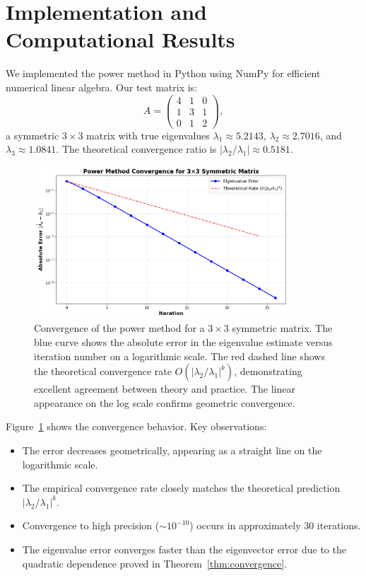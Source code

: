 \documentclass[11pt,a4paper]{article}
\begin{document}
\section{Implementation and Computational Results}

We implemented the power method in Python using NumPy for efficient numerical linear algebra. Our test matrix is:
\begin{equation}
A = \begin{pmatrix}
4 & 1 & 0 \\
1 & 3 & 1 \\
0 & 1 & 2
\end{pmatrix},
\end{equation}
a symmetric $3 \times 3$ matrix with true eigenvalues $\lambda_1 \approx 5.2143$, $\lambda_2 \approx 2.7016$, and $\lambda_3 \approx 1.0841$. The theoretical convergence ratio is $|\lambda_2/\lambda_1| \approx 0.5181$.

\begin{figure}[t]
\centering
\includegraphics[width=0.85\textwidth]{power_method_convergence.png}
\caption{Convergence of the power method for a $3 \times 3$ symmetric matrix. The blue curve shows the absolute error in the eigenvalue estimate versus iteration number on a logarithmic scale. The red dashed line shows the theoretical convergence rate $O(|\lambda_2/\lambda_1|^k)$, demonstrating excellent agreement between theory and practice. The linear appearance on the log scale confirms geometric convergence.}
\label{fig:convergence}
\end{figure}

Figure~\ref{fig:convergence} shows the convergence behavior. Key observations:
\begin{itemize}
    \item The error decreases geometrically, appearing as a straight line on the logarithmic scale.
    \item The empirical convergence rate closely matches the theoretical prediction $|\lambda_2/\lambda_1|^k$.
    \item Convergence to high precision ($\sim 10^{-10}$) occurs in approximately 30 iterations.
    \item The eigenvalue error converges faster than the eigenvector error due to the quadratic dependence proved in Theorem~\ref{thm:convergence}.
\end{itemize}
\end{document}
